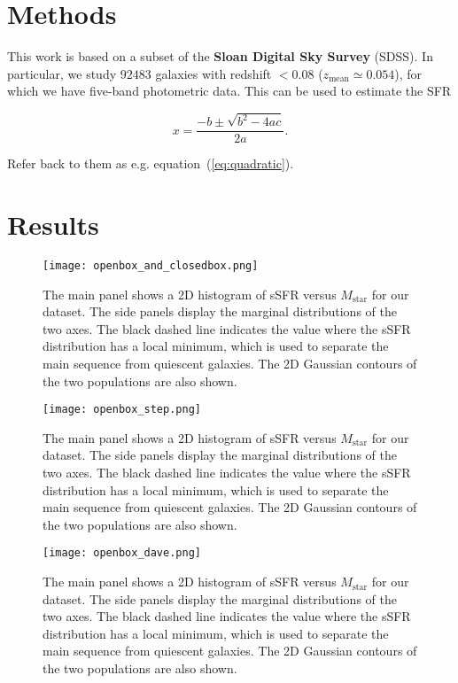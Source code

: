 \documentclass[fleqn,usenatbib]{mnras}
\begin{document}
\section{Methods}\label{sec:methods}
This work is based on a subset of the \textbf{Sloan Digital Sky Survey} (SDSS). In particular, we study $92483$ galaxies with redshift $< 0.08$ ($z_{\text{mean}} \simeq 0.054$), for which we have five-band photometric data. This can be used to estimate the SFR

\begin{equation}
    x=\frac{-b\pm\sqrt{b^2-4ac}}{2a}.
	\label{eq:quadratic}
\end{equation}

Refer back to them as e.g. equation~(\ref{eq:quadratic}).



\section{Results}\label{sec:results}
\begin{figure}
	\texttt{[image: openbox\_and\_closedbox.png]}
    \caption{The main panel shows a 2D histogram of sSFR versus $M_{\text{star}}$ for our dataset. The side panels display the marginal distributions of the two axes. The black dashed line indicates the value where the sSFR distribution has a local minimum, which is used to separate the main sequence from quiescent galaxies. The 2D Gaussian contours of the two populations are also shown.}
    \label{fig:openbox_and_closedbox}
\end{figure}

\begin{figure}
	\texttt{[image: openbox\_step.png]}
    \caption{The main panel shows a 2D histogram of sSFR versus $M_{\text{star}}$ for our dataset. The side panels display the marginal distributions of the two axes. The black dashed line indicates the value where the sSFR distribution has a local minimum, which is used to separate the main sequence from quiescent galaxies. The 2D Gaussian contours of the two populations are also shown.}
    \label{fig:openbox_step}
\end{figure}

\begin{figure}
	\texttt{[image: openbox\_dave.png]}
    \caption{The main panel shows a 2D histogram of sSFR versus $M_{\text{star}}$ for our dataset. The side panels display the marginal distributions of the two axes. The black dashed line indicates the value where the sSFR distribution has a local minimum, which is used to separate the main sequence from quiescent galaxies. The 2D Gaussian contours of the two populations are also shown.}
    \label{fig:openbox_dave}
\end{figure}
\end{document}
